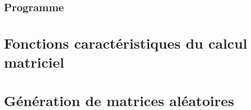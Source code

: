 \documentclass{report}
\begin{document}
      \subsection{Programme}
        
    \section{Fonctions caractéristiques du calcul matriciel}
      
      
      \newpage
    \section{Génération de matrices aléatoires}
      
      
      \newpage
  
\end{document}
